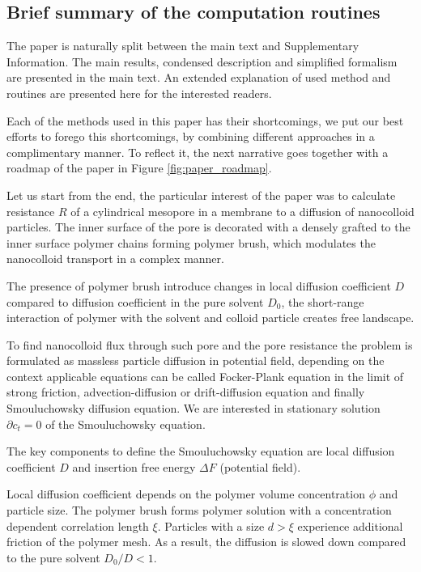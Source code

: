 \documentclass[12pt, a4paper]{article}
\begin{document}
\subsection*{Brief summary of the computation routines}

The paper is naturally split between the main text and Supplementary Information. 
The main results, condensed description and simplified formalism are presented in the main text.
An extended explanation of used method and routines are presented here for the interested readers. 

Each of the methods used in this paper has their shortcomings, we put our best efforts to forego this shortcomings, by combining different approaches in a complimentary manner. 
To reflect it, the next narrative goes together with a roadmap of the paper in Figure \ref{fig:paper_roadmap}.

Let us start from the end, the particular interest of the paper was to calculate resistance $R$ of a cylindrical mesopore in a membrane to a diffusion of nanocolloid particles. 
The inner surface of the pore is decorated with a densely grafted to the inner surface polymer chains forming polymer brush, which modulates the nanocolloid transport in a complex manner.

The presence of polymer brush introduce changes in local diffusion coefficient $D$ compared to diffusion coefficient in the pure solvent $D_0$, the short-range interaction of polymer with the solvent and colloid particle creates free landscape.

To find nanocolloid flux through such pore and the pore resistance the problem is formulated as massless particle diffusion in potential field, depending on the context applicable equations can be called Focker-Plank equation in the limit of strong friction, advection-diffusion or drift-diffusion equation and finally Smouluchowsky diffusion equation.
We are interested in stationary solution $\partial c_t = 0$ of the Smouluchowsky equation.

The key components to define the Smouluchowsky equation are local diffusion coefficient $D$ and insertion free energy $\Delta F$ (potential field). 

Local diffusion coefficient depends on the polymer volume concentration $\phi$ and particle size. 
The polymer brush forms polymer solution with a concentration dependent correlation length $\xi$. 
Particles with a size $d>\xi$ experience additional friction of the polymer mesh. 
As a result, the diffusion is slowed down compared to the pure solvent $D_0/D<1$.
\end{document}
